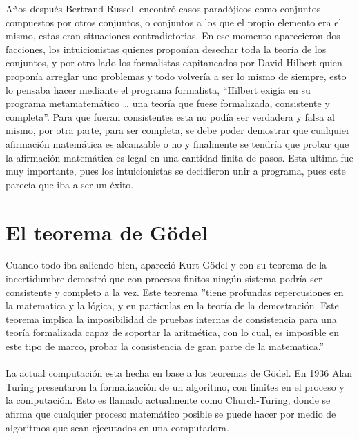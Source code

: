 \documentclass[11pt,letterpaper]{article}
\begin{document}
Años después Bertrand Russell encontró casos paradójicos como conjuntos compuestos por otros conjuntos, o conjuntos a los que el propio elemento era el mismo, estas eran situaciones contradictorias. En ese momento aparecieron dos facciones, los intuicionistas quienes proponían desechar toda la teoría de los conjuntos, y por otro lado los formalistas capitaneados por David Hilbert quien proponía arreglar uno problemas y todo volvería a ser lo mismo de siempre, esto lo pensaba hacer mediante el programa formalista,\cite{profor} “Hilbert exigía en su programa metamatemático … una teoría que fuese formalizada, consistente y completa”. Para que fueran consistentes esta no podía ser verdadera y falsa al mismo, por otra parte, para ser completa, se debe poder demostrar que cualquier afirmación matemática es alcanzable o no y finalmente se tendría que probar que la afirmación matemática es legal en una cantidad finita de pasos. Esta ultima fue muy importante, pues los intuicionistas se decidieron unir a programa, pues este parecía que iba a ser un éxito. 

\section{El teorema de Gödel}
Cuando todo iba saliendo bien, apareció Kurt Gödel y con su teorema de la incertidumbre demostró que con procesos finitos ningún sistema podría ser consistente y completo a la vez. Este teorema \cite{izquierdo2003argumento} ”tiene profundas repercusiones en la matematica y la lógica, y en partículas en la teoría de la demostración. Este teorema implica la imposibilidad de pruebas internas de consistencia para una teoría formalizada capaz de soportar la aritmética, con lo cual, es imposible en este tipo de marco, probar la consistencia de gran parte de la matematica.”
\\
\\
La actual computación esta hecha en base a los teoremas de Gödel. En 1936 Alan Turing presentaron la formalización de un algoritmo, con limites en el proceso y la computación. Esto es llamado actualmente como Church-Turing, donde se afirma que cualquier proceso matemático posible se puede hacer por medio de algoritmos que sean ejecutados en una computadora.
\end{document}
